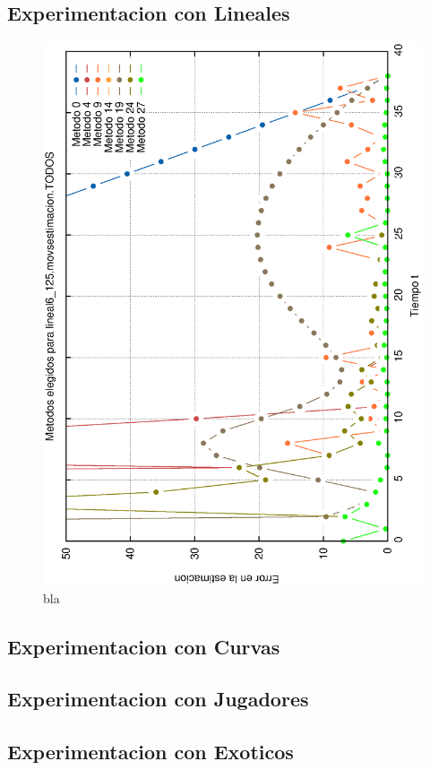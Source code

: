 \subsection{Experimentacion con Lineales}
\begin{figure}[H]
\includegraphics[width=\textwidth]{img/lineal6_125.movsestimacion.TODOS.elegidos.ps}
     \caption{bla}
\end{figure}

\subsection{Experimentacion con Curvas}

\subsection{Experimentacion con Jugadores}

\subsection{Experimentacion con Exoticos}